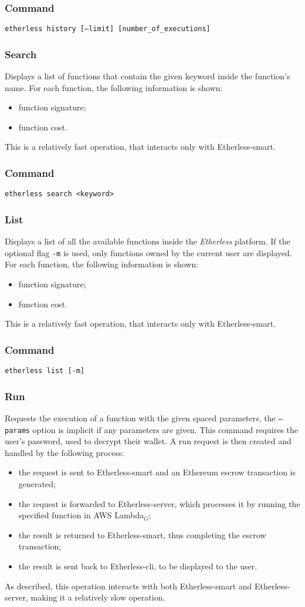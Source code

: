 	\subsubsection*{Command}
	\texttt{etherless history [---limit] [number\_of\_executions]}
	\subsubsection{Search}
	Displays a list of functions that contain the given keyword inside the function's name. For each function, the following information is shown:
	\begin{itemize}
		\item function signature;
		\item function cost.
	\end{itemize}
	This is a relatively fast operation, that interacts only with Etherless-smart.
	\subsubsection*{Command}
	\texttt{etherless search <keyword>}
	\subsubsection{List}
	Displays a list of all the available functions inside the \textit{Etherless} platform. If the optional flag \texttt{-m} is used, only functions owned by the current user are displayed. For each function, the following information is shown:
	\begin{itemize}
		\item function signature;
		\item function cost.
	\end{itemize}This is a relatively fast operation, that interacts only with Etherless-smart.
	\subsubsection*{Command}
	\texttt{etherless list [-m]}
	\subsubsection{Run}
	Requests the execution of a function with the given spaced parameters, the \texttt{---params} option is implicit if any parameters are given. This command requires the user's password, used to decrypt their wallet. A run request is then created and handled by the following process:
	\begin{itemize}
		\item the request is sent to Etherless-smart and an Ethereum escrow transaction is generated;
		\item the request is forwarded to Etherless-server, which processes it by running the specified function in AWS Lambda$_{G}$;
		\item the result is returned to Etherless-smart, thus completing the escrow transaction;
		\item the result is sent back to Etherless-cli, to be displayed to the user.
	\end{itemize}
	As described, this operation interacts with both Etherless-smart and Etherless-server, making it a relatively slow operation.
